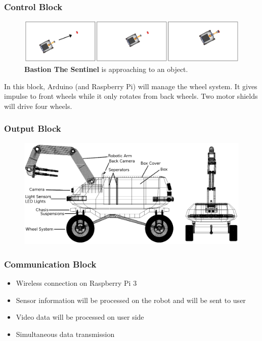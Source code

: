 \documentclass{beamer}
\begin{document}
 \begin{frame}
  \frametitle{Control Block}
  \begin{flushleft}
     \begin{figure}[h!]
      \begin{center}
       \includegraphics[scale=0.2]{3frame}
       \caption{\textbf{Bastion The Sentinel} is approaching to an object.}
      \end{center}
     \end{figure}
     In this block, Arduino (and Raspberry Pi) will manage the wheel system. It gives impulse to front wheels while it only 
     rotates from back wheels. Two motor shields will drive four wheels.
    \end{flushleft}
 \end{frame}

 \begin{frame}
  \frametitle{Output Block}
  \begin{figure}[h]
      \begin{center}
       \includegraphics[scale=0.3]{skeleton_detailed}
      \end{center}
     \end{figure}
 \end{frame}
 
 \begin{frame}
  \frametitle{Communication Block}
  \begin{itemize}
   \item Wireless connection on Raspberry Pi 3
   \item Sensor information will be processed on the robot and will be sent to user
   \item Video data will be processed on user side
   \item Simultaneous data transmission
  \end{itemize}
 \end{frame}
\end{document}
